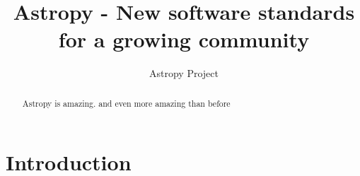 \documentclass[modern]{aastex61}
\begin{document}
\title{Astropy - New software standards for a growing community}



\author{Astropy Project}

\begin{abstract}

Astropy is amazing. and even more amazing than before

\end{abstract}

\keywords{}

\section{Introduction} \label{sec:intro}
\end{document}
